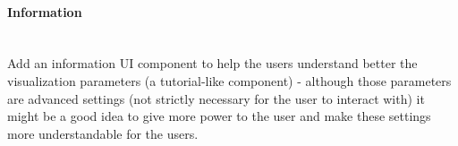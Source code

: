   \paragraph*{Information} \hfill \\
  \indent Add an information UI component to help the users understand better the visualization parameters (a tutorial-like component) - although those parameters are advanced settings (not strictly necessary for the user to interact with) it might be a good idea to give more power to the user and make these settings more understandable for the users.

